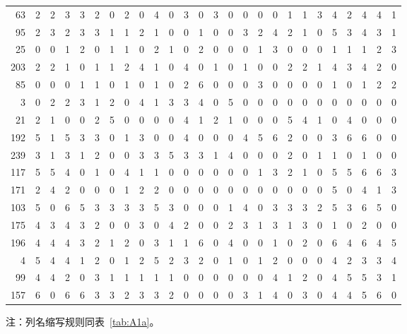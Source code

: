\begin{longtable}{@{\extracolsep{\fill}}rccccccccccccccccccccccccc@{}}
63 & 2 & 2 & 3 & 3 & 2 & 0 & 2 & 0 & 4 & 0 & 3 & 0 & 3 & 0 & 0 & 0 & 0 & 1 & 1 & 3 & 4 & 2 & 4 & 4 & 1 \\
95 & 2 & 3 & 2 & 3 & 3 & 1 & 1 & 2 & 1 & 0 & 0 & 1 & 0 & 0 & 3 & 2 & 4 & 2 & 1 & 0 & 5 & 3 & 4 & 3 & 1 \\
25 & 0 & 0 & 1 & 2 & 0 & 1 & 1 & 0 & 2 & 1 & 0 & 2 & 0 & 0 & 0 & 1 & 3 & 0 & 0 & 0 & 1 & 1 & 1 & 2 & 3 \\
203 & 2 & 2 & 1 & 0 & 1 & 1 & 2 & 4 & 1 & 0 & 4 & 0 & 1 & 0 & 1 & 0 & 0 & 2 & 2 & 1 & 4 & 3 & 4 & 2 & 0 \\
85 & 0 & 0 & 0 & 1 & 1 & 0 & 1 & 0 & 1 & 0 & 2 & 6 & 0 & 0 & 0 & 3 & 0 & 0 & 0 & 0 & 1 & 0 & 1 & 2 & 2 \\
3 & 0 & 2 & 2 & 3 & 1 & 2 & 0 & 4 & 1 & 3 & 3 & 4 & 0 & 5 & 0 & 0 & 0 & 0 & 0 & 0 & 0 & 0 & 0 & 0 & 0 \\
21 & 2 & 1 & 0 & 0 & 2 & 5 & 0 & 0 & 0 & 0 & 4 & 1 & 2 & 1 & 0 & 0 & 0 & 5 & 4 & 1 & 0 & 4 & 0 & 0 & 0 \\
192 & 5 & 1 & 5 & 3 & 3 & 0 & 1 & 3 & 0 & 0 & 4 & 0 & 0 & 0 & 4 & 5 & 6 & 2 & 0 & 0 & 3 & 6 & 6 & 0 & 0 \\
239 & 3 & 1 & 3 & 1 & 2 & 0 & 0 & 3 & 3 & 5 & 3 & 3 & 1 & 4 & 0 & 0 & 0 & 2 & 0 & 1 & 1 & 0 & 1 & 0 & 0 \\
117 & 5 & 5 & 4 & 0 & 1 & 0 & 4 & 1 & 1 & 0 & 0 & 0 & 0 & 0 & 0 & 1 & 3 & 2 & 1 & 0 & 5 & 5 & 6 & 6 & 3 \\
171 & 2 & 4 & 2 & 0 & 0 & 0 & 1 & 2 & 2 & 0 & 0 & 0 & 0 & 0 & 0 & 0 & 0 & 0 & 0 & 0 & 5 & 0 & 4 & 1 & 3 \\
103 & 5 & 0 & 6 & 5 & 3 & 3 & 3 & 3 & 5 & 3 & 0 & 0 & 0 & 1 & 4 & 0 & 3 & 3 & 3 & 2 & 5 & 3 & 6 & 5 & 0 \\
175 & 4 & 3 & 4 & 3 & 2 & 0 & 0 & 3 & 0 & 4 & 2 & 0 & 0 & 2 & 3 & 1 & 3 & 1 & 3 & 0 & 1 & 0 & 2 & 0 & 0 \\
196 & 4 & 4 & 4 & 3 & 2 & 1 & 2 & 0 & 3 & 1 & 1 & 6 & 0 & 4 & 0 & 0 & 1 & 0 & 2 & 0 & 6 & 4 & 6 & 4 & 5 \\
4 & 5 & 4 & 4 & 1 & 2 & 0 & 1 & 2 & 5 & 2 & 3 & 2 & 0 & 1 & 0 & 1 & 2 & 0 & 0 & 0 & 4 & 2 & 3 & 3 & 4 \\
99 & 4 & 4 & 2 & 0 & 3 & 1 & 1 & 1 & 1 & 1 & 0 & 0 & 0 & 0 & 0 & 0 & 4 & 1 & 2 & 0 & 4 & 5 & 5 & 3 & 1 \\
157 & 6 & 0 & 6 & 6 & 3 & 3 & 2 & 3 & 3 & 2 & 0 & 0 & 0 & 0 & 3 & 1 & 4 & 0 & 3 & 0 & 4 & 4 & 5 & 6 & 0 \\
\end{longtable}
\endgroup

\vspace{-0.5em}
\noindent\footnotesize 注：列名缩写规则同表~\ref{tab:A1a}。\par
